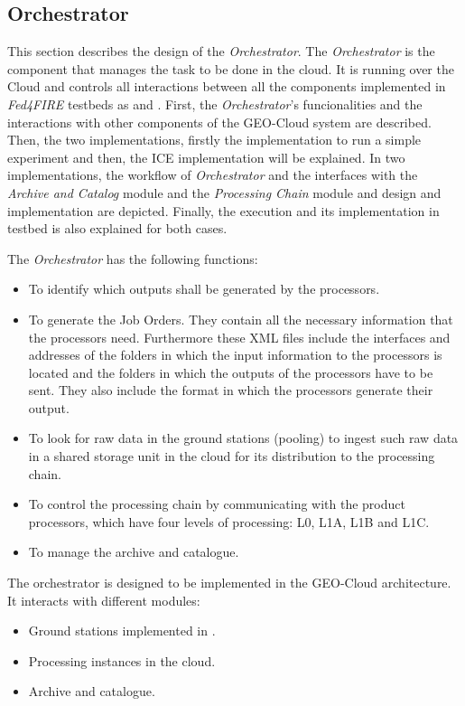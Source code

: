 \subsection{Orchestrator}
\label{sub:orch}
This section describes the design of the \emph{Orchestrator}. The \emph{Orchestrator} is the
component that manages the task to be done in the cloud. It is running over the
\bonfire Cloud and controls all interactions between all the components implemented in \emph{Fed4FIRE} testbeds as \bonfire and \vw.
First, the \emph{Orchestrator}'s funcionalities and the interactions with other
components of the GEO-Cloud system are described. Then, the two implementations,
firstly the implementation to run a simple experiment and then, the ICE
implementation will be explained. In two implementations, the workflow of
\emph{Orchestrator} and the interfaces with the \emph{Archive and Catalog} module and the
\emph{Processing Chain} module and design and implementation are
depicted. Finally, the execution and its implementation in \bonfire testbed is
also explained for both cases.



The \emph{Orchestrator} has the following functions:

\begin{itemize}
\item To identify which outputs shall be generated by the processors.
\item To generate the Job Orders. They contain all the necessary information
  that the processors need. Furthermore these \ac{XML} files include the interfaces and addresses of the folders in which the input information to the processors is located and the folders in which the outputs of the processors have to be sent. They also include the format in which the processors generate their output.
\item To look for raw data in the ground stations (pooling) to ingest such raw data in a shared storage unit in the cloud for its distribution to the processing chain.
\item To control the processing chain by communicating with the product processors, which have four levels of processing: L0, L1A, L1B and L1C.
\item To manage the archive and catalogue.
\end{itemize}

The orchestrator is designed to be implemented in the GEO-Cloud architecture. It
interacts with different modules:
\begin{itemize}

\item Ground stations implemented in \vw.
\item Processing instances in the cloud.
\item Archive and catalogue.
\end{itemize}

